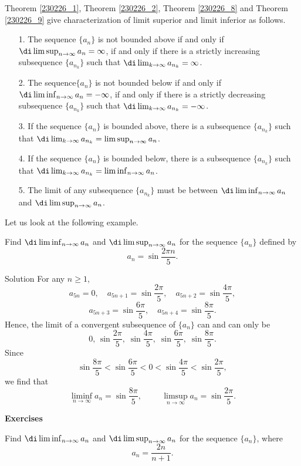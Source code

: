 \begin{highlight}{}
Theorem \ref{230226_1}, Theorem \ref{230226_2}, Theorem \ref{230226_8} and Theorem \ref{230226_9} give characterization of  limit superior and limit inferior as follows.
 
\begin{enumerate}[1.]
\item[1.] The sequence $\{a_n\}$ is not bounded above  if and only if $\di\limsup_{n\to\infty}a_n=\infty$, if and only if there is a strictly increasing subsequence $\{a_{n_k}\}$ such that $\di\lim_{k\to\infty}a_{n_k}=\infty$.
\item[2.] The sequence$\{a_n\}$ is not bounded below  if and only if $\di\liminf_{n\to\infty}a_n=-\infty$, if and only if there is a strictly decreasing subsequence $\{a_{n_k}\}$ such that $\di\lim_{k\to\infty}a_{n_k}=-\infty$.\end{enumerate}\end{highlight}\begin{highlight}{}\begin{enumerate}[1.]
\item[3.] If the sequence $\{a_n\}$ is   bounded above, there is a subsequence $\{a_{n_k}\}$ such that $\di\lim_{k\to\infty}a_{n_k}=\limsup_{n\to\infty}a_n$.
\item[4.] If the sequence $\{a_n\}$ is   bounded below, there is a subsequence $\{a_{n_k}\}$ such that $\di\lim_{k\to\infty}a_{n_k}=\liminf_{n\to\infty}a_n$.
\item[5.] The limit of any subsequence $\{a_{n_k}\}$ must be between $\di\liminf_{n\to\infty}a_n$ and $\di\limsup_{n\to\infty}a_n$. 
\end{enumerate}
\end{highlight}
Let us look at the following example.
 \begin{example}{}
Find $\di\liminf_{n\to\infty}a_n$ and $\di \limsup_{n\to \infty}a_n$ for the sequence $\{a_n\}$   defined by
\[ a_n=\sin \frac{2\pi n}{5}.\]
\end{example}
\begin{solution}{Solution}
For any $n\geq 1$,  
\[a_{5n}=0,\quad a_{5n+1}=\sin\frac{2\pi}{5}, \quad a_{5n+2}=\sin\frac{4\pi}{5}, \]\[a_{5n+3}=\sin\frac{6\pi}{5}, \quad a_{5n+4}=\sin\frac{8\pi}{5}.\]
Hence, the limit of a convergent subsequence of $\{a_n\}$ can and can only be
\[0, \,\sin\frac{2\pi}{5}, \;\sin\frac{4\pi}{5},\;\sin\frac{6\pi}{5},\;\sin\frac{8\pi}{5}.\] 
Since
\[\sin\frac{8\pi}{5}<\sin\frac{6\pi}{5}<0<\sin\frac{4\pi}{5}<\sin\frac{2\pi}{5},\]we find that
\[\liminf_{n\to\infty}a_n=\sin\frac{8\pi}{5},\hspace{1cm}\limsup_{n\to\infty}a_n=\sin\frac{2\pi}{5}.\] 

\end{solution}
\vp
\noindent
{\bf \large Exercises  \thesection}
\setcounter{myquestion}{1}
 \begin{question}{\themyquestion}
Find $\di\liminf_{n\to\infty}a_n$ and $\di \limsup_{n\to \infty}a_n$ for the sequence $\{a_n\}$, where
\[ a_n=\frac{2n}{n+1}.\]
\end{question}

